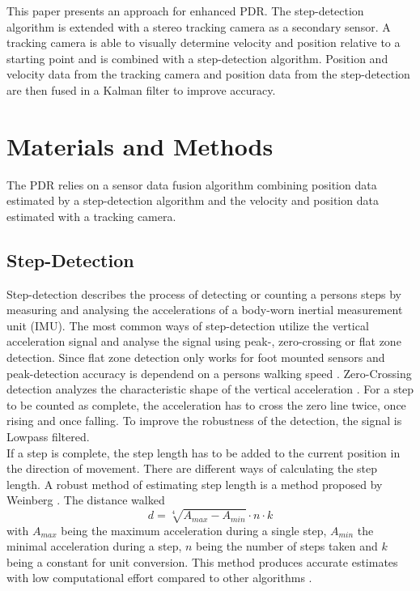 \documentclass[engproc,conferenceproceedings,submit,pdftex,moreauthors]{Definitions/mdpi}
\begin{document}
This paper presents an approach for enhanced PDR. The step-detection algorithm is extended with a stereo tracking camera as a secondary sensor. A tracking camera is able to visually determine velocity and position relative to a starting point and is combined with a step-detection algorithm. Position and velocity data from the tracking camera and position data from the step-detection are then fused in a Kalman filter to improve accuracy.
\section{Materials and Methods}

The PDR relies on a sensor data fusion algorithm combining position data estimated by a step-detection algorithm and the velocity and position data estimated with a tracking camera.\\

\subsection{Step-Detection}
Step-detection describes the process of detecting or counting a persons steps by measuring and analysing the accelerations of a body-worn inertial measurement unit (IMU). The most common ways of step-detection utilize  the vertical acceleration signal and analyse the signal using peak-, zero-crossing or flat zone detection. Since flat zone detection only works for foot mounted sensors and peak-detection accuracy is dependend on a persons walking speed \cite{shin2007}. Zero-Crossing detection analyzes the characteristic shape of the vertical acceleration \cite{zhao2022}. For a step to be counted as complete, the acceleration has to cross the zero line twice, once rising and once falling. To improve the robustness of the detection, the signal is Lowpass filtered. \\

If a step is complete, the step length has to be added to the current position in the direction of movement. There are different ways of calculating the step length. A robust method of estimating step length is a method proposed by Weinberg \cite{weinberg2002}. The distance walked
 \begin{equation}
	d = \sqrt[4]{A_{max}-A_{min}}\cdot n\cdot k
\end{equation}
 with $A_{max}$ being the maximum acceleration during a single step, $A_{min}$ the minimal acceleration during a step, $n$ being the number of steps taken and $k$ being a constant for unit conversion. This method produces accurate estimates with low computational effort compared to other algorithms \cite{petukhov2022, shin2007, zizzo2017}.
\end{document}
